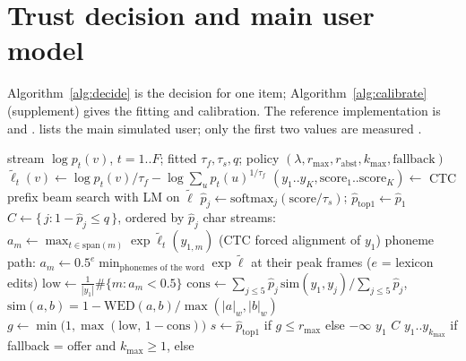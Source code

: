 \section{Trust decision and main user model}
\label{app:algorithm}

Algorithm~\ref{alg:decide} is the decision for one item; Algorithm~\ref{alg:calibrate} (supplement) gives the fitting and calibration. The reference implementation is  and .  lists the main simulated user; only the first two values are measured \citep{cai2024gaze}.

\begin{algorithm}[H]
\caption{Trust decision for one item}
\label{alg:decide}
\small
\begin{algorithmic}[1]
\Require stream $\log p_t(v)$, $t = 1..F$; fitted $\tau_f, \tau_s, q$; policy $(\lambda, r_{\max}, r_{\mathrm{abst}}, k_{\max}, \text{fallback})$
\State $\tilde\ell_t(v) \gets \log p_t(v)/\tau_f - \log\sum_{u} p_t(u)^{1/\tau_f}$ 
\State $(y_1..y_K, \text{score}_1..\text{score}_K) \gets$ CTC prefix beam search with LM on $\tilde\ell$ 
 \Return {}
\EndIf
\State $\hat p_j \gets \mathrm{softmax}_j(\text{score}/\tau_s)$; \quad $\hat p_{\mathrm{top1}} \gets \hat p_1$
\State $C \gets \{\, j : 1 - \hat p_j \le q \,\}$, ordered by $\hat p_j$ 
 
  \State char streams: $a_m \gets \max_{t \in \mathrm{span}(m)} \exp\tilde\ell_t(y_{1,m})$ (CTC forced alignment of $y_1$)
  \State phoneme path: $a_m \gets 0.5^{e}\min_{\text{phonemes of the word}} \exp\tilde\ell$ at their peak frames ($e$ = lexicon edits)
\EndFor
\State $\mathrm{low} \gets \frac{1}{|y_1|}\#\{m : a_m < 0.5\}$ 
\State $\mathrm{cons} \gets \sum_{j \le 5} \hat p_j\, \mathrm{sim}(y_1, y_j) / \sum_{j \le 5} \hat p_j$, \quad $\mathrm{sim}(a,b) = 1 - \mathrm{WED}(a,b)/\max(|a|_w, |b|_w)$
\State $g \gets \min\bigl(1, \max(\mathrm{low},\, 1 - \mathrm{cons})\bigr)$ 
 \Return {}
\EndIf
\State $s \gets \hat p_{\mathrm{top1}}$ if $g \le r_{\max}$ else $-\infty$ 
 \Return {} $y_1$
\EndIf
{} \Return {} $C$
\EndIf
\State \Return {} $y_1..y_{k_{\max}}$ if fallback = offer and $k_{\max} \ge 1$, else 
\end{algorithmic}
\end{algorithm}

